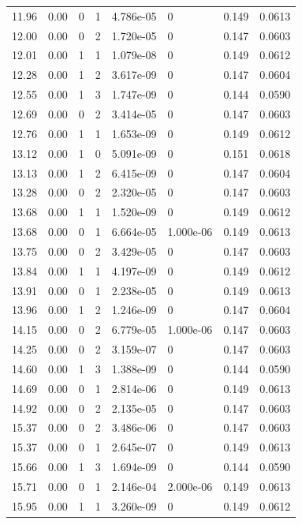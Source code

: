 \documentclass[preview]{standalone}
\begin{document}
{{{\begin{tabular}{L{1.2cm}C{1.2cm} C{0.3cm}C{0.5cm} C{1.4cm}C{1.4cm} C{1.4cm}C{1.4cm}}
  11.96  &  0.00  & 0     &  1 &  4.786e-05  & 0  & 0.149 &  0.0613   \\ 
  12.00  &  0.00  & 0     &  2 &  1.720e-05  & 0  & 0.147 &  0.0603   \\ 
  12.01  &  0.00  & 1     &  1 &  1.079e-08  & 0  & 0.149 &  0.0612   \\ 
  12.28  &  0.00  & 1     &  2 &  3.617e-09  & 0  & 0.147 &  0.0604   \\ 
  12.55  &  0.00  & 1     &  3 &  1.747e-09  & 0  & 0.144 &  0.0590   \\ 
  12.69  &  0.00  & 0     &  2 &  3.414e-05  & 0  & 0.147 &  0.0603   \\ 
  12.76  &  0.00  & 1     &  1 &  1.653e-09  & 0  & 0.149 &  0.0612   \\ 
  13.12  &  0.00  & 1     &  0 &  5.091e-09  & 0  & 0.151 &  0.0618   \\ 
  13.13  &  0.00  & 1     &  2 &  6.415e-09  & 0  & 0.147 &  0.0604   \\ 
  13.28  &  0.00  & 0     &  2 &  2.320e-05  & 0  & 0.147 &  0.0603   \\ 
  13.68  &  0.00  & 1     &  1 &  1.520e-09  & 0  & 0.149 &  0.0612   \\ 
  13.68  &  0.00  & 0     &  1 &  6.664e-05  & 1.000e-06  & 0.149 &  0.0613   \\ 
  13.75  &  0.00  & 0     &  2 &  3.429e-05  & 0  & 0.147 &  0.0603   \\ 
  13.84  &  0.00  & 1     &  1 &  4.197e-09  & 0  & 0.149 &  0.0612   \\ 
  13.91  &  0.00  & 0     &  1 &  2.238e-05  & 0  & 0.149 &  0.0613   \\ 
  13.96  &  0.00  & 1     &  2 &  1.246e-09  & 0  & 0.147 &  0.0604   \\ 
  14.15  &  0.00  & 0     &  2 &  6.779e-05  & 1.000e-06  & 0.147 &  0.0603   \\ 
  14.25  &  0.00  & 0     &  2 &  3.159e-07  & 0  & 0.147 &  0.0603   \\ 
  14.60  &  0.00  & 1     &  3 &  1.388e-09  & 0  & 0.144 &  0.0590   \\ 
  14.69  &  0.00  & 0     &  1 &  2.814e-06  & 0  & 0.149 &  0.0613   \\ 
  14.92  &  0.00  & 0     &  2 &  2.135e-05  & 0  & 0.147 &  0.0603   \\ 
  15.37  &  0.00  & 0     &  2 &  3.486e-06  & 0  & 0.147 &  0.0603   \\ 
  15.37  &  0.00  & 0     &  1 &  2.645e-07  & 0  & 0.149 &  0.0613   \\ 
  15.66  &  0.00  & 1     &  3 &  1.694e-09  & 0  & 0.144 &  0.0590   \\ 
  15.71  &  0.00  & 0     &  1 &  2.146e-04  & 2.000e-06  & 0.149 &  0.0613   \\ 
  15.95  &  0.00  & 1     &  1 &  3.260e-09  & 0  & 0.149 &  0.0612   \\ 
\hline 
\end{tabular} 

}}}
\end{document}
